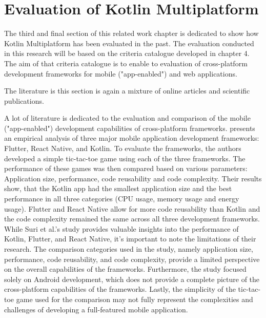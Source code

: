 \section{Evaluation of Kotlin Multiplatform}
The third and final section of this related work chapter is dedicated to show how Kotlin Multiplatform has been evaluated in the past. The evaluation conducted in this research will be based on the criteria catalogue developed in chapter 4. The aim of that criteria catalogue is to enable to evaluation of cross-platform development frameworks for mobile ("app-enabled") and web applications. 

The literature is this section is again a mixture of online articles and scientific publications. 

A lot of literature is dedicated to the evaluation and comparison of the mobile ("app-enabled") development capabilities of cross-platform frameworks. 
\cite{Suri.2023} presents an empirical analysis of three major mobile application development frameworks: Flutter, React Native, and Kotlin. To evaluate the frameworks, the authors developed a simple tic-tac-toe game using each of the three frameworks. The performance of these games was then compared based on various parameters: Application size, performance, code reusability and code complexity. Their results show, that the Kotlin app had the smallest application size and the best performance in all three categories (CPU usage, memory usage and energy usage). Flutter and React Native allow for more code reusability than Kotlin and the code complexity remained the same across all three development frameworks. While Suri et al.'s study provides valuable insights into the performance of Kotlin, Flutter, and React Native, it's important to note the limitations of their research. The comparison categories used in the study, namely application size, performance, code reusability, and code complexity, provide a limited perspective on the overall capabilities of the frameworks. Furthermore, the study focused solely on Android development, which does not provide a complete picture of the cross-platform capabilities of the frameworks. Lastly, the simplicity of the tic-tac-toe game used for the comparison may not fully represent the complexities and challenges of developing a full-featured mobile application.


